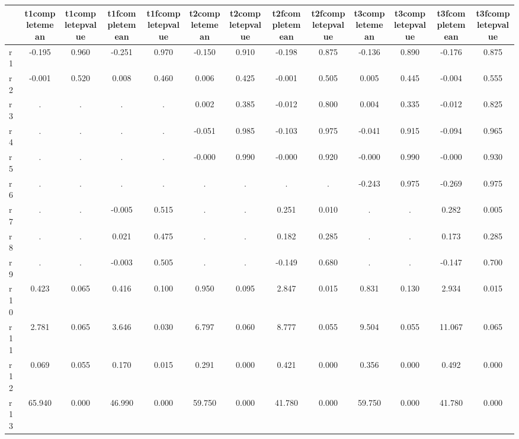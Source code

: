 \begin{table}[htbp]
\begin{tabular}{lcccccccccccc} \hline \hline
 & t1completemean  & t1completepvalue  & t1fcompletemean  & t1fcompletepvalue  & t2completemean  & t2completepvalue  & t2fcompletemean  & t2fcompletepvalue  & t3completemean  & t3completepvalue  & t3fcompletemean  & t3fcompletepvalue  \\  \hline 
r1 &    -0.195 &     0.960 &    -0.251 &     0.970 &    -0.150 &     0.910 &    -0.198 &     0.875 &    -0.136 &     0.890 &    -0.176 &     0.875 \\  
r2 &    -0.001 &     0.520 &     0.008 &     0.460 &     0.006 &     0.425 &    -0.001 &     0.505 &     0.005 &     0.445 &    -0.004 &     0.555 \\  
r3 &         . &         . &         . &         . &     0.002 &     0.385 &    -0.012 &     0.800 &     0.004 &     0.335 &    -0.012 &     0.825 \\  
r4 &         . &         . &         . &         . &    -0.051 &     0.985 &    -0.103 &     0.975 &    -0.041 &     0.915 &    -0.094 &     0.965 \\  
r5 &         . &         . &         . &         . &    -0.000 &     0.990 &    -0.000 &     0.920 &    -0.000 &     0.990 &    -0.000 &     0.930 \\  
r6 &         . &         . &         . &         . &         . &         . &         . &         . &    -0.243 &     0.975 &    -0.269 &     0.975 \\  
r7 &         . &         . &    -0.005 &     0.515 &         . &         . &     0.251 &     0.010 &         . &         . &     0.282 &     0.005 \\  
r8 &         . &         . &     0.021 &     0.475 &         . &         . &     0.182 &     0.285 &         . &         . &     0.173 &     0.285 \\  
r9 &         . &         . &    -0.003 &     0.505 &         . &         . &    -0.149 &     0.680 &         . &         . &    -0.147 &     0.700 \\  
r10 &     0.423 &     0.065 &     0.416 &     0.100 &     0.950 &     0.095 &     2.847 &     0.015 &     0.831 &     0.130 &     2.934 &     0.015 \\  
r11 &     2.781 &     0.065 &     3.646 &     0.030 &     6.797 &     0.060 &     8.777 &     0.055 &     9.504 &     0.055 &    11.067 &     0.065 \\  
r12 &     0.069 &     0.055 &     0.170 &     0.015 &     0.291 &     0.000 &     0.421 &     0.000 &     0.356 &     0.000 &     0.492 &     0.000 \\  
r13 &    65.940 &     0.000 &    46.990 &     0.000 &    59.750 &     0.000 &    41.780 &     0.000 &    59.750 &     0.000 &    41.780 &     0.000 \\  
\hline \hline \end{tabular}
\end{table}
